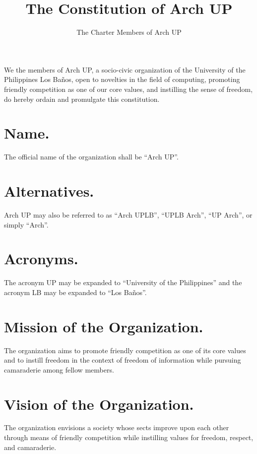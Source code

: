 \documentclass[12pt]{constitution}
\begin{document}
\doublespacing
\title{The Constitution of Arch UP}
\author{The Charter Members of Arch UP}
\date{}
\maketitle
\setcounter{tocdepth}{0}
\tableofcontents
\newpage

We the members of Arch UP, a socio-civic organization of the University of the Philippines Los Ba\~{n}os,
open to novelties in the field of computing,
promoting friendly competition as one of our core values,
and instilling the sense of freedom,
do hereby ordain and promulgate this constitution.



\section{Name.}
The official name of the organization shall be ``Arch UP''.

\section{Alternatives.}
Arch UP may also be referred to as ``Arch UPLB'', ``UPLB Arch'', ``UP Arch'', or simply ``Arch''.

\section{Acronyms.}
The acronym UP may be expanded to ``University of the Philippines'' and the acronym LB may be expanded to ``Los Ba\~{n}os''.



\section{Mission of the Organization.}
The organization aims to promote friendly competition as one of its core values and to instill freedom in the context
of freedom of information while pursuing camaraderie among fellow members.
 
\section{Vision of the Organization.}
The organization envisions a society whose sects improve upon each other through means of friendly competition while
instilling values for freedom, respect, and camaraderie.
\end{document}
